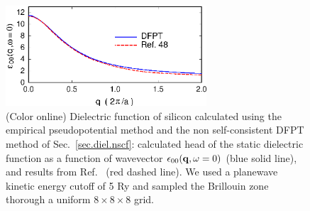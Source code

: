 \documentclass[twocolumn,prb,showpacs,superscriptaddress]{revtex4}
\def\w{\omega}
\def\q{{\bf q}}
\begin{document}
\begin  {figure}
\begin  {center}
\includegraphics[width=7.5cm]{fig1.eps}
\end    {center}
\caption{\label{fig1}
        (Color online)
        Dielectric function of silicon calculated using the empirical pseudopotential method and the
        non self-consistent DFPT method of Sec.\ \ref{sec.diel.nscf}:
        calculated head of the static dielectric function as a function of wavevector $\epsilon_{00}(\q,\w=0)$ (blue solid line),
        and results from Ref.\  (red dashed line). We used a planewave kinetic energy cutoff of 5 Ry
        and sampled the Brillouin zone thorough a uniform $8\times 8\times 8$ grid.
        }
\end    {figure}
\end{document}
